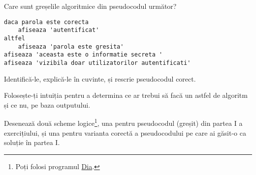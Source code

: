 \begin{Exercise}[difficulty=2,title={Găsește eroarea de logică}]
\ExePart
Care sunt greșelile algoritmice din pseudocodul următor?

\begin{lstlisting}[language=pseudocode]
daca parola este corecta
	afiseaza 'autentificat'
altfel
	afiseaza 'parola este gresita'
afiseaza 'aceasta este o informatie secreta '
afiseaza 'vizibila doar utilizatorilor autentificati'
\end{lstlisting}

Identifică-le, explică-le în cuvinte, și rescrie pseudocodul corect.

Folosește-ți intuiția pentru a determina ce ar trebui
să facă un astfel de algoritm și ce nu, pe baza outputului.

\ExePart
Desenează două scheme logice\footnote{Poți folosi programul
\href{http://projects.gnome.org/dia/}{Dia}.}, una pentru pseudocodul (greșit)
din partea I a exercițiului, și una pentru varianta corectă
a pseudocodului pe care ai găsit-o ca soluție în partea I.
\end{Exercise}
